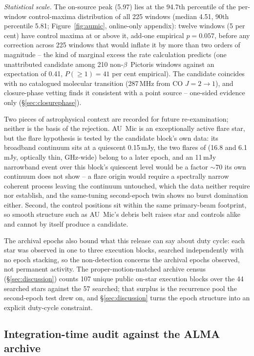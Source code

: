 \documentclass{openjournal}
\begin{document}
\emph{Statistical scale.} The on-source peak (5.97) lies at the
94.7th percentile of the per-window control-maxima distribution of
all 225 windows (median 4.51, 90th percentile 5.81;
Figure~\ref{fig:aumic}, online-only appendix): twelve windows (5 per
cent) have control maxima at or above it, add-one empirical
$p=0.057$, before any correction across 225 windows that would
inflate it by more than two orders of magnitude -- the kind of
marginal excess the rate calculation predicts (one unattributed
candidate among 210 non-$\beta$~Pictoris windows against an
expectation of 0.41, $P(\geq1)=41$ per cent empirical). The candidate
coincides with no catalogued molecular transition
(287\,MHz from CO $J{=}2{\to}1$), and closure-phase vetting finds it
consistent with a point source -- one-sided evidence only
(\S\ref{sec:closurephase}).

Two pieces of astrophysical context are recorded for future
re-examination; neither is the basis of the rejection. AU~Mic is an
exceptionally active flare star, but the flare hypothesis is tested
by the candidate block's own data: its broadband continuum sits at a
quiescent 0.15\,mJy, the two flares of \citet{MacGregor2020} (16.8
and 6.1\,mJy, optically thin, GHz-wide) belong to a later epoch, and
an 11\,mJy narrowband event over this block's quiescent level would
be a factor ${\sim}70$ its own continuum does not show -- a flare
origin would require a spectrally narrow coherent process leaving the
continuum untouched, which the data neither require nor establish,
and the same-tuning second-epoch twin shows no burst domination
either. Second, the control positions sit within the same
primary-beam footprint, so smooth structure such as AU~Mic's debris
belt raises star and controls alike and cannot by itself produce a
candidate.

The archival epochs also bound what this release can say about duty
cycle: each star was observed in one to three execution blocks,
searched independently with no epoch stacking, so the non-detection
concerns the archival epochs observed, not permanent activity. The
proper-motion-matched archive census (\S\ref{sec:discussion}) counts
107 unique public on-star execution blocks over the 44 searched stars
against the 57 searched; that surplus is the recurrence pool the
second-epoch test drew on, and \S\ref{sec:discussion} turns the epoch
structure into an explicit duty-cycle constraint.
\subsection{Integration-time audit against the ALMA archive}
\label{sec:timeaudit}
\end{document}

